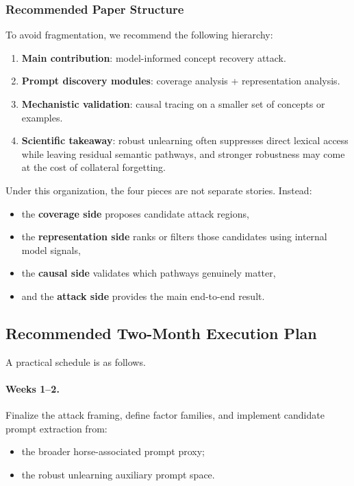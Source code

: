 \subsubsection{Recommended Paper Structure}
\label{subsubsec:recommended_paper_structure}

To avoid fragmentation, we recommend the following hierarchy:
\begin{enumerate}
    \item \textbf{Main contribution}: model-informed concept recovery attack.
    \item \textbf{Prompt discovery modules}: coverage analysis + representation analysis.
    \item \textbf{Mechanistic validation}: causal tracing on a smaller set of concepts or examples.
    \item \textbf{Scientific takeaway}: robust unlearning often suppresses direct lexical access while leaving residual semantic pathways, and stronger robustness may come at the cost of collateral forgetting.
\end{enumerate}

Under this organization, the four pieces are not separate stories. Instead:
\begin{itemize}
    \item the \textbf{coverage side} proposes candidate attack regions,
    \item the \textbf{representation side} ranks or filters those candidates using internal model signals,
    \item the \textbf{causal side} validates which pathways genuinely matter,
    \item and the \textbf{attack side} provides the main end-to-end result.
\end{itemize}

\subsection{Recommended Two-Month Execution Plan}
\label{subsubsec:execution_plan}

A practical schedule is as follows.

\paragraph{Weeks 1--2.}
Finalize the attack framing, define factor families, and implement candidate prompt extraction from:
\begin{itemize}
    \item the broader horse-associated prompt proxy;
    \item the robust unlearning auxiliary prompt space.
\end{itemize}


